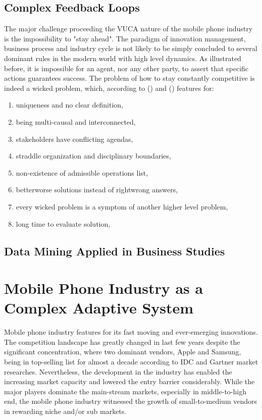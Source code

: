 \documentclass[utf8,english]{gradu3}
\begin{document}
\section{Complex Feedback Loops}

The major challenge proceeding the VUCA nature of the mobile phone industry is the impossibility to "stay ahead". The paradigm of innovation management, business process and industry cycle is not likely to be simply concluded to several dominant rules in the modern world with high level dynamics. As illustrated before, it is impossible for an agent, nor any other party, to assert that specific actions guarantees success. The problem of how to stay constantly competitive is indeed a wicked problem, which, according to \citeauthor{rittel1974wicked} (\citeyear{rittel1974wicked}) and \citeauthor{buchanan1992wicked} (\citeyear{buchanan1992wicked}) features for:

\begin{enumerate}
    \item uniqueness and no clear definition,
    \item being multi-causal and interconnected,
    \item stakeholders have conflicting agendas,
    \item straddle organization and disciplinary boundaries,
    \item non-existence of admissible operations list,
    \item better\/worse solutions instead of right\/wrong answers,
    \item every wicked problem is a symptom of another higher level problem,
    \item long time to evaluate solution,
\end{enumerate}

\section{Data Mining Applied in Business Studies}

\chapter{Mobile Phone Industry as a Complex Adaptive System}

Mobile phone industry features for its fast moving and ever-emerging innovations. The competition landscape has greatly changed in last few years despite the significant concentration, where two dominant vendors, Apple and Samsung, being in top-selling list for almost a decade according to IDC and Gartner market researches. Nevertheless, the development in the industry has enabled the increasing market capacity and lowered the entry barrier considerably. While the major players dominate the main-stream markets, especially in middle-to-high end, the mobile phone industry witnessed the growth of small-to-medium vendors in rewarding niche and/or sub markets.
\end{document}
